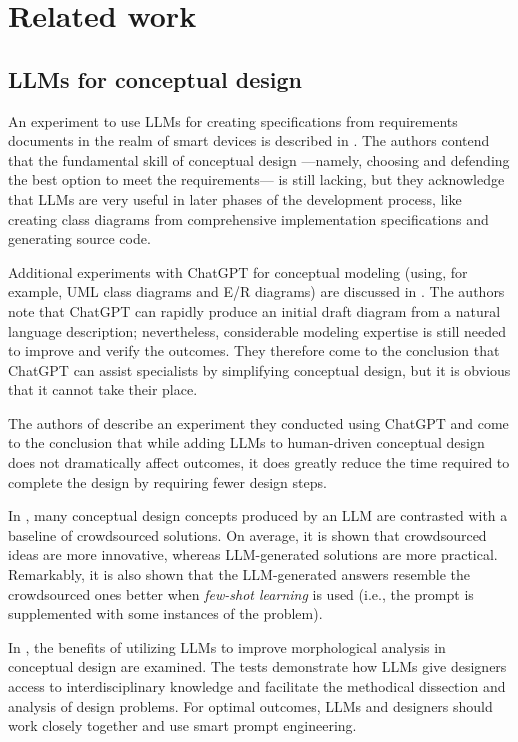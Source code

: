 \section{Related work}
\label{sec:rw}
\subsection{LLMs for conceptual design}

An experiment to use LLMs for creating specifications from requirements documents in the realm of smart devices is described in \cite{DBLP:conf/hci/LutzeW24}. The authors contend that the fundamental skill of conceptual design ---namely, choosing and defending the best option to meet the requirements--- is still lacking, but they acknowledge that LLMs are very useful in later phases of the development process, like creating class diagrams from comprehensive implementation specifications and generating source code. 

Additional experiments with ChatGPT for conceptual modeling (using, for example, UML class diagrams and E/R diagrams) are discussed in \cite{DBLP:journals/emisaij/FillFK23}. 
The authors note that ChatGPT can rapidly produce an initial draft diagram from a natural language description; nevertheless, considerable modeling expertise is still needed to improve and verify the outcomes. They therefore come to the conclusion that ChatGPT can assist specialists by simplifying conceptual design, but it is obvious that it cannot take their place.

The authors of \cite{Zhou24} describe an experiment they conducted using ChatGPT and come to the conclusion that while adding LLMs to human-driven conceptual design does not dramatically affect outcomes, it does greatly reduce the time required to complete the design by requiring fewer design steps.

In \cite{DBLP:journals/corr/abs-2306-01779}, many conceptual design concepts produced by an LLM are contrasted with a baseline of crowdsourced solutions. On average, it is shown that crowdsourced ideas are more innovative, whereas LLM-generated solutions are more practical. Remarkably, it is also shown that the LLM-generated answers resemble the crowdsourced ones better when \emph{few-shot learning} is used (i.e., the prompt is supplemented with some instances of the problem).

In \cite{Chen24}, the benefits of utilizing LLMs to improve morphological analysis in conceptual design are examined. The tests demonstrate how LLMs give designers access to interdisciplinary knowledge and facilitate the methodical dissection and analysis of design problems. For optimal outcomes, LLMs and designers should work closely together and use smart prompt engineering.

